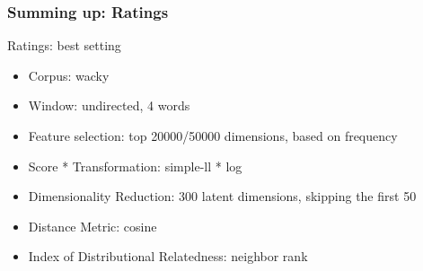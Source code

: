 \documentclass[t]{beamer} %
\begin{document}
\begin{frame}
  \frametitle{Summing up: Ratings}
  \begin{exampleblock}{Ratings: best setting}
    \begin{itemize}\footnotesize
    \item Corpus: wacky
    \item Window: undirected, 4 words 
    \item Feature selection: top 20000/50000 dimensions, based on frequency
    \item Score * Transformation: simple-ll * log
    \item Dimensionality Reduction: 300 latent dimensions, skipping the first 50
    \item Distance Metric: cosine
    \item Index of Distributional Relatedness: neighbor rank
    \end{itemize}
  \end{exampleblock}  
\end{frame}
\end{document}
